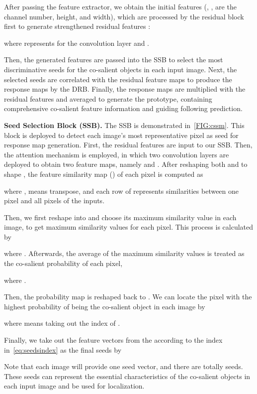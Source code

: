 \documentclass[10pt,twocolumn,letterpaper]{article}
\begin{document}
After passing the feature extractor, we obtain the initial features  (, ,  are the channel number, height, and width), which are processed by the residual block first to generate strengthened residual features :

where  represents for the  convolution layer and . 

Then, the generated features  are passed into the SSB to select the most discriminative seeds for the co-salient objects in each input image. Next, the selected seeds are correlated with the residual feature maps to produce the response maps by the DRB. Finally, the response maps are multiplied with the residual features and averaged to generate the prototype, containing comprehensive co-salient feature information and guiding following prediction.

\textbf{Seed Selection Block (SSB).} The SSB is demonstrated in~\cref{FIG:cssm}. This block is deployed to detect each image's most representative pixel as seed for response map generation. First, the residual features  are input to our SSB. Then, the attention mechanism is employed, in which two  convolution layers are deployed to obtain two feature maps, namely  and . After reshaping both  and  to shape , the feature similarity map () of each pixel is computed as

where ,  means transpose,  and each row of  represents similarities between one pixel and all pixels of the  inputs.

Then, we first reshape  into  and choose its maximum similarity value in each image, to get  maximum similarity values for each pixel. This process is calculated by

where . Afterwards, the average of the  maximum similarity values is treated as the co-salient probability of each pixel,

where .

Then, the probability map is reshaped back to . We can locate the pixel with the highest probability of being the co-salient object in each image by 


where  means taking out the index of . 

Finally, we take out the feature vectors from the  according to the index in~\cref{eq:seedsindex} as the final seeds by

Note that each image will provide one seed vector, and there are totally  seeds. These seeds can represent the essential characteristics of the co-salient objects in each input image and be used for localization. 
\end{document}
